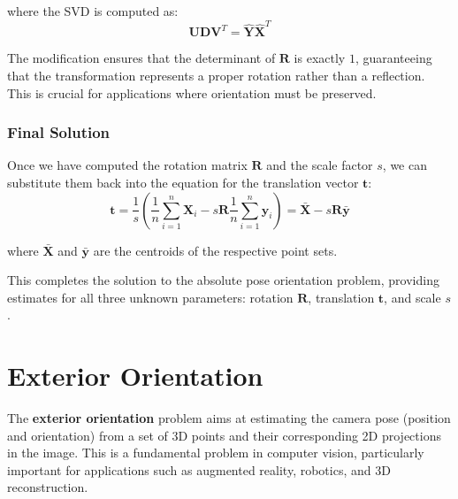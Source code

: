 \documentclass[11pt,a4paper]{article}
\theoremstyle{definition}
\theoremstyle{plain}
\theoremstyle{remark}
\begin{document}
where the SVD is computed as:
\begin{equation} \nonumber
    \mathbf{U} \mathbf{D} \mathbf{V}^T = \hat{\mathbf{Y}} \hat{\mathbf{X}}^T
\end{equation}

\begin{tcolorbox}[colback=orange!5!white,colframe=orange!75!black,title=\textbf{Rotation vs. Reflection}]
The modification ensures that the determinant of $\mathbf{R}$ is exactly $1$, guaranteeing that the transformation represents a proper rotation rather than a reflection. This is crucial for applications where orientation must be preserved.
\end{tcolorbox}

\subsubsection{Final Solution}\label{subsubsec:final_solution}

Once we have computed the rotation matrix $\mathbf{R}$ and the scale factor $s$, we can substitute them back into the equation for the translation vector $\mathbf{t}$:
\begin{equation} \nonumber
    \mathbf{t} = \frac{1}{s} \left( \frac{1}{n}\sum_{i=1}^{n} \mathbf{X}_i - s \mathbf{R} \frac{1}{n}\sum_{i=1}^{n} \mathbf{y}_i \right) = \bar{\mathbf{X}} - s \mathbf{R} \bar{\mathbf{y}}
\end{equation}

where $\bar{\mathbf{X}}$ and $\bar{\mathbf{y}}$ are the centroids of the respective point sets.

This completes the solution to the absolute pose orientation problem, providing estimates for all three unknown parameters: rotation $\mathbf{R}$, translation $\mathbf{t}$, and scale $s$.




\section{Exterior Orientation}\label{sec:exterior_orientation}

The \textbf{exterior orientation} problem aims at estimating the camera pose (position and orientation) from a set of 3D points and their corresponding 2D projections in the image. This is a fundamental problem in computer vision, particularly important for applications such as augmented reality, robotics, and 3D reconstruction.
\end{document}
